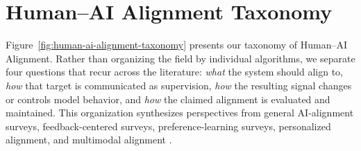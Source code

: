\documentclass[10pt,a4paper,twocolumn]{article}
\begin{document}
\section{Human--AI Alignment Taxonomy}
\label{sec:alignment-taxonomy}



Figure~\ref{fig:human-ai-alignment-taxonomy} presents our taxonomy of Human--AI Alignment. Rather than organizing the field by individual algorithms, we separate four questions that recur across the literature: \emph{what} the system should align to, \emph{how} that target is communicated as supervision, \emph{how} the resulting signal changes or controls model behavior, and \emph{how} the claimed alignment is evaluated and maintained. This organization synthesizes perspectives from general AI-alignment surveys, feedback-centered surveys, preference-learning surveys, personalized alignment, and multimodal alignment \citep{ji2025alignment,fernandes2024feedback,jiang2024preferencesurvey,gao2024unifiedpreference,guan2025personalizedsurvey,yu2025multimodalsurvey}.
\end{document}
